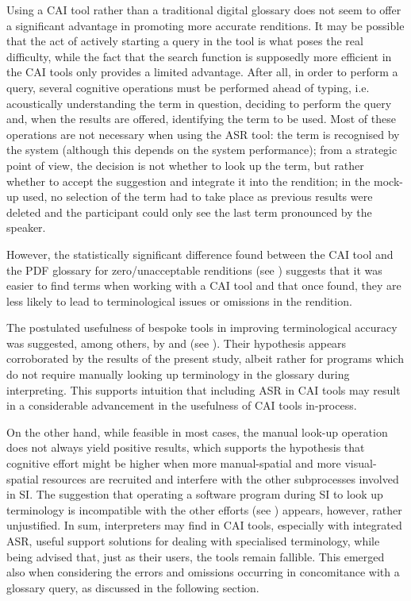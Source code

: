 Using a CAI tool rather than a traditional digital glossary does not seem to offer a significant advantage in promoting more accurate renditions. It may be possible that the act of actively starting a query in the tool is what poses the real difficulty, while the fact that the search function is supposedly more efficient in the CAI tools only provides a limited advantage. After all, in order to perform a query, several cognitive operations must be performed ahead of typing, i.e. acoustically understanding the term in question, deciding to perform the query and, when the results are offered, identifying the term to be used. Most of these operations are not necessary when using the ASR tool: the term is recognised by the system (although this depends on the system performance); from a strategic point of view, the decision is not whether to look up the term, but rather whether to accept the suggestion and integrate it into the rendition; in the mock-up used, no selection of the term had to take place as previous results were deleted and the participant could only see the last term pronounced by the speaker.

However, the statistically significant difference found between the CAI tool and the PDF glossary for zero/unacceptable renditions (see ) suggests that it was easier to find terms when working with a CAI tool and that once found, they are less likely to lead to terminological issues or omissions in the rendition.

The postulated usefulness of bespoke tools in improving terminological accuracy was suggested, among others, by \citet{rutten_informations-_2007} and \citet{will_terminology_2007, will_zur_2015} (see ). Their hypothesis appears corroborated by the results of the present study, albeit rather for programs which do not require manually looking up terminology in the glossary during interpreting. This supports  intuition that including ASR in CAI tools may result in a considerable advancement in the usefulness of CAI tools in-process.

On the other hand, while feasible in most cases, the manual look-up operation does not always yield positive results, which supports the hypothesis that cognitive effort might be higher when more manual-spatial and more visual-spatial resources are recruited and interfere with the other subprocesses involved in SI. The suggestion that operating a software program during SI to look up terminology is incompatible with the other efforts (see ) appears, however, rather unjustified. In sum, interpreters may find in CAI tools, especially with integrated ASR, useful support solutions for dealing with specialised terminology, while being advised that, just as their users, the tools remain fallible. This emerged also when considering the errors and omissions occurring in concomitance with a glossary query, as discussed in the following section.

